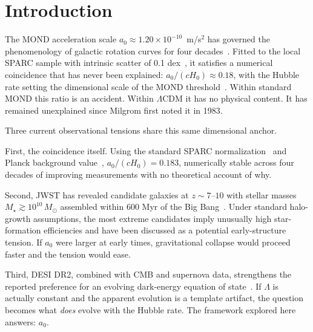 \documentclass[
    aps,
    prd,
    reprint,
    superscriptaddress,
    nofootinbib,
    floatfix
]{revtex4-2}
\begin{document}
\section{Introduction}
\label{sec:intro}

The MOND acceleration scale $a_0 \approx 1.20 \times 10^{-10}$~m/s$^2$
has governed the phenomenology of galactic rotation curves for four
decades~\cite{Milgrom1983}. Fitted to the local SPARC sample with
intrinsic scatter of 0.1 dex~\cite{Lelli2016, Famaey2012}, it satisfies
a numerical coincidence that has never been explained:
$a_0/(cH_0) \approx 0.18$, with the Hubble rate setting the dimensional
scale of the MOND threshold~\cite{Milgrom1999, McGaugh2004}. Within
standard MOND this ratio is an accident. Within $\Lambda$CDM it has no
physical content. It has remained unexplained since Milgrom first noted
it in 1983.

Three current observational tensions share this same dimensional anchor.

First, the coincidence itself. Using the standard SPARC
normalization~\cite{Lelli2016} and Planck background
value~\cite{Planck2018}, $a_0/(cH_0) = 0.183$, numerically stable
across four decades of improving measurements with no theoretical
account of why.

Second, JWST has revealed candidate galaxies at $z \sim 7\text{--}10$
with stellar masses $M_\star \gtrsim 10^{10}\,M_\odot$ assembled within
600 Myr of the Big Bang~\cite{Labbe2023, BoylanKolchin2023}. Under
standard halo-growth assumptions, the most extreme candidates imply
unusually high star-formation efficiencies and have been discussed as a
potential early-structure tension. If $a_0$ were larger at early times,
gravitational collapse would proceed faster and the tension would ease.

Third, DESI DR2, combined with CMB and supernova data, strengthens the
reported preference for an evolving dark-energy equation of
state~\cite{DESI2025}. If $\Lambda$ is actually constant and the
apparent evolution is a template artifact, the question becomes what
\emph{does} evolve with the Hubble rate. The framework explored here
answers: $a_0$.
\end{document}
